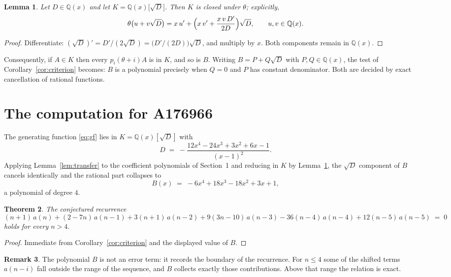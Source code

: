 \documentclass[11pt,a4paper]{article}
\theoremstyle{plain}
\newtheorem{theorem}{Theorem}
\newtheorem{lemma}[theorem]{Lemma}
\theoremstyle{definition}
\newtheorem{remark}[theorem]{Remark}
\begin{document}
\begin{lemma}\label{lem:field}
Let $D\in\mathbb{Q}(x)$ and let $K=\mathbb{Q}(x)\bigl[\sqrt{D}\bigr]$. Then $K$ is closed
under $\theta$; explicitly,
\[
\theta\bigl(u+v\sqrt{D}\bigr)=x\,u'+\Bigl(x\,v'+\frac{x\,v\,D'}{2D}\Bigr)\sqrt{D},
\qquad u,v\in\mathbb{Q}(x).
\]
\end{lemma}

\begin{proof}
Differentiate: $(\sqrt{D})'=D'/(2\sqrt{D})=\bigl(D'/(2D)\bigr)\sqrt{D}$, and multiply by
$x$. Both components remain in $\mathbb{Q}(x)$.
\end{proof}

Consequently, if $A\in K$ then every $p_{i}(\theta+i)A$ is in $K$, and so is $B$. Writing
$B=P+Q\sqrt{D}$ with $P,Q\in\mathbb{Q}(x)$, the test of Corollary~\ref{cor:criterion}
becomes: $B$ is a polynomial precisely when $Q=0$ and $P$ has constant denominator. Both
are decided by exact cancellation of rational functions.

\section{The computation for A176966}

The generating function \eqref{eq:gf} lies in $K=\mathbb{Q}(x)[\sqrt{D}]$ with
\[
D \;=\; - \frac{12 x^{4} - 24 x^{3} + 3 x^{2} + 6 x - 1}{\left(x - 1\right)^{2}} .
\]
Applying Lemma~\ref{lem:transfer} to the coefficient polynomials of Section~1 and reducing
in $K$ by Lemma~\ref{lem:field}, the $\sqrt{D}$ component of $B$ cancels identically and
the rational part collapses to
\[
B(x)\;=\;- 6 x^{4} + 18 x^{3} - 18 x^{2} + 3 x + 1 ,
\]
a polynomial of degree $4$.

\begin{theorem}
The conjectured recurrence
\[
(n + 1)\,a(n) + (2 - 7 n)\,a(n-1) + 3 \left(n + 1\right)\,a(n-2) + 9 \left(3 n - 10\right)\,a(n-3) -  36 \left(n - 4\right)\,a(n-4) + 12 \left(n - 5\right)\,a(n-5) \;=\;0
\]
holds for every $n>4$.
\end{theorem}

\begin{proof}
Immediate from Corollary~\ref{cor:criterion} and the displayed value of $B$.
\end{proof}

\begin{remark}
The polynomial $B$ is not an error term: it records the boundary of the recurrence. For
$n\le4$ some of the shifted terms $a(n-i)$ fall outside the range of the sequence,
and $B$ collects exactly those contributions. Above that range the relation is exact.
\end{remark}
\end{document}
